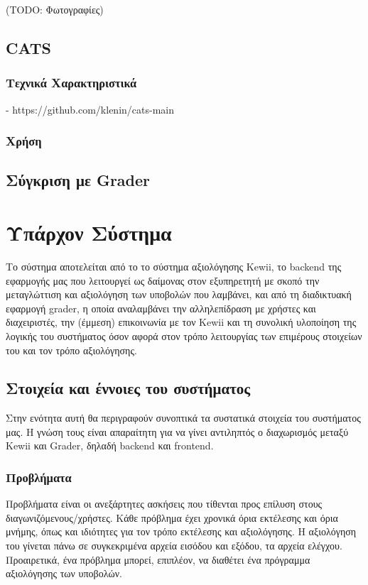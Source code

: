 \documentclass[diploma]{softlab-thesis}
\begin{document}
\bigskip

(TODO: Φωτογραφίες)

\section{CATS}

\subsection{Τεχνικά Χαρακτηριστικά}

- https://github.com/klenin/cats-main

\subsection{Χρήση}

\section{Σύγκριση με Grader}

\chapter{Υπάρχον Σύστημα}

Το σύστημα αποτελείται από το το σύστημα αξιολόγησης Kewii, το backend της
εφαρμογής μας που λειτουργεί ως δαίμονας στον εξυπηρετητή με σκοπό την
μεταγλώττιση και αξιολόγηση των υποβολών που λαμβάνει, και από τη διαδικτυακή
εφαρμογή grader, η οποία αναλαμβάνει την αλληλεπίδραση με χρήστες και
διαχειριστές, την (έμμεση) επικοινωνία με τον Kewii και τη συνολική υλοποίηση
της λογικής του συστήματος όσον αφορά στον τρόπο λειτουργίας των επιμέρους
στοιχείων του και τον τρόπο αξιολόγησης.

\section{Στοιχεία και έννοιες του συστήματος}

Στην ενότητα αυτή θα περιγραφούν συνοπτικά τα συστατικά στοιχεία του συστήματος
μας. Η γνώση τους είναι απαραίτητη για να γίνει αντιληπτός ο διαχωρισμός μεταξύ
Kewii και Grader, δηλαδή backend και frontend.

\subsection{Προβλήματα}

Προβλήματα είναι οι ανεξάρτητες ασκήσεις που τίθενται προς επίλυση στους
διαγωνιζόμενους/χρήστες. Κάθε πρόβλημα έχει χρονικά όρια εκτέλεσης και όρια
μνήμης, όπως και ιδιότητες για τον τρόπο εκτέλεσης και αξιολόγησης. Η
αξιολόγηση του γίνεται πάνω σε συγκεκριμένα αρχεία εισόδου και εξόδου, τα
αρχεία ελέγχου. Προαιρετικά, ένα πρόβλημα μπορεί, επιπλέον, να διαθέτει ένα
πρόγραμμα αξιολόγησης των υποβολών.
\end{document}
